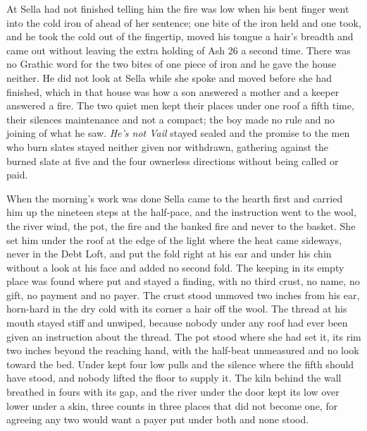 At  Sella had not finished telling him the fire was low when his bent finger went into the cold iron of  ahead of her sentence; one bite of the iron held and one took, and he took the cold out of the fingertip, moved his tongue a hair's breadth and came out without leaving the extra holding of Ash 26 a second time. There was no Grathic word for the two bites of one piece of iron and he gave the house neither. He did not look at Sella while she spoke and moved before she had finished, which in that house was how a son answered a mother and a keeper answered a fire. The two quiet men kept their places under one roof a fifth time, their silences maintenance and not a compact; the boy made no rule and no joining of what he saw. \emph{He's not Vail} stayed sealed and the promise to the men who burn slates stayed neither given nor withdrawn, gathering against the burned slate at five and the four ownerless directions without being called or paid.

\scenebreak

When the morning's work was done Sella came to the hearth first and carried him up the nineteen steps at the half-pace, and the instruction went to the wool, the river wind, the pot, the fire and the banked fire and never to the basket. She set him under the roof at the edge of the light where the heat came sideways, never in the Debt Loft, and put the fold right at his ear and under his chin without a look at his face and added no second fold. The keeping in its empty place was found where put and stayed a finding, with no third crust, no name, no gift, no payment and no payer. The crust stood unmoved two inches from his ear, horn-hard in the dry cold with its corner a hair off the wool. The thread at his mouth stayed stiff and unwiped, because nobody under any roof had ever been given an instruction about the thread. The pot stood where she had set it, its rim two inches beyond the reaching hand, with the half-beat unmeasured and no look toward the bed. Under   kept four low pulls and the silence where the fifth should have stood, and nobody lifted the floor to supply it. The kiln behind the wall breathed in fours with its gap, and the river under the door kept its low over lower under a skin, three counts in three places that did not become one, for agreeing any two would want a payer put under both and none stood.

